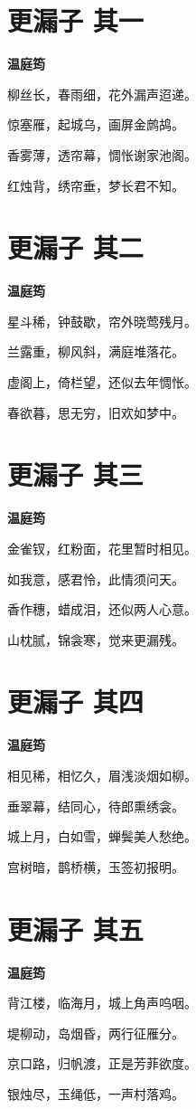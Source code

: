 \documentclass[12pt,a4paper]{ctexbook}
\begin{document}
\section{更漏子 其一}
\textbf{温庭筠}\par\vspace{0.5em}
柳丝长，春雨细，花外漏声迢递。\par
惊塞雁，起城乌，画屏金鹧鸪。\par
香雾薄，透帘幕，惆怅谢家池阁。\par
红烛背，绣帘垂，梦长君不知。\par

\section{更漏子 其二}
\textbf{温庭筠}\par\vspace{0.5em}
星斗稀，钟鼓歇，帘外晓莺残月。\par
兰露重，柳风斜，满庭堆落花。\par
虚阁上，倚栏望，还似去年惆怅。\par
春欲暮，思无穷，旧欢如梦中。\par

\section{更漏子 其三}
\textbf{温庭筠}\par\vspace{0.5em}
金雀钗，红粉面，花里暂时相见。\par
如我意，感君怜，此情须问天。\par
香作穗，蜡成泪，还似两人心意。\par
山枕腻，锦衾寒，觉来更漏残。\par

\section{更漏子 其四}
\textbf{温庭筠}\par\vspace{0.5em}
相见稀，相忆久，眉浅淡烟如柳。\par
垂翠幕，结同心，待郎熏绣衾。\par
城上月，白如雪，蝉鬓美人愁绝。\par
宫树暗，鹊桥横，玉签初报明。\par

\section{更漏子 其五}
\textbf{温庭筠}\par\vspace{0.5em}
背江楼，临海月，城上角声呜咽。\par
堤柳动，岛烟昏，两行征雁分。\par
京口路，归帆渡，正是芳菲欲度。\par
银烛尽，玉绳低，一声村落鸡。\par
\end{document}
